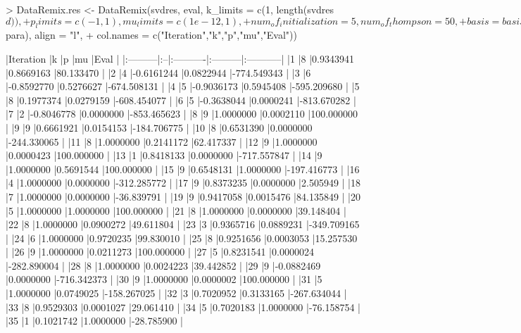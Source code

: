 \documentclass{article}
\begin{document}
\begin{Schunk}
\begin{Sinput}
> DataRemix.res <- DataRemix(svdres, eval, k_limits = c(1, length(svdres$d)), 
+                  p_limits = c(-1,1), mu_limits = c(1e-12,1), 
+                  num_of_initialization = 5, num_of_thompson = 50, 
+                  basis = basis_short, xi = 0.1, full = T, verbose = F, 
+                  X = X, penalty = 100)
> knitr::kable(cbind(1:55,DataRemix.res$para), align = "l", 
+              col.names = c("Iteration","k","p","mu","Eval"))
\end{Sinput}
\begin{Soutput}
|Iteration |k  |p          |mu        |Eval        |
|:---------|:--|:----------|:---------|:-----------|
|1         |8  |0.9343941  |0.8669163 |80.133470   |
|2         |4  |-0.6161244 |0.0822944 |-774.549343 |
|3         |6  |-0.8592770 |0.5276627 |-674.508131 |
|4         |5  |-0.9036173 |0.5945408 |-595.209680 |
|5         |8  |0.1977374  |0.0279159 |-608.454077 |
|6         |5  |-0.3638044 |0.0000241 |-813.670282 |
|7         |2  |-0.8046778 |0.0000000 |-853.465623 |
|8         |9  |1.0000000  |0.0002110 |100.000000  |
|9         |9  |0.6661921  |0.0154153 |-184.706775 |
|10        |8  |0.6531390  |0.0000000 |-244.330065 |
|11        |8  |1.0000000  |0.2141172 |62.417337   |
|12        |9  |1.0000000  |0.0000423 |100.000000  |
|13        |1  |0.8418133  |0.0000000 |-717.557847 |
|14        |9  |1.0000000  |0.5691544 |100.000000  |
|15        |9  |0.6548131  |1.0000000 |-197.416773 |
|16        |4  |1.0000000  |0.0000000 |-312.285772 |
|17        |9  |0.8373235  |0.0000000 |2.505949    |
|18        |7  |1.0000000  |0.0000000 |-36.839791  |
|19        |9  |0.9417058  |0.0015476 |84.135849   |
|20        |5  |1.0000000  |1.0000000 |100.000000  |
|21        |8  |1.0000000  |0.0000000 |39.148404   |
|22        |8  |1.0000000  |0.0900272 |49.611804   |
|23        |3  |0.9365716  |0.0889231 |-349.709165 |
|24        |6  |1.0000000  |0.9720235 |99.830010   |
|25        |8  |0.9251656  |0.0003053 |15.257530   |
|26        |9  |1.0000000  |0.0211273 |100.000000  |
|27        |5  |0.8231541  |0.0000024 |-282.890004 |
|28        |8  |1.0000000  |0.0024223 |39.442852   |
|29        |9  |-0.0882469 |0.0000000 |-716.342373 |
|30        |9  |1.0000000  |0.0000002 |100.000000  |
|31        |5  |1.0000000  |0.0749025 |-158.267025 |
|32        |3  |0.7020952  |0.3133165 |-267.634044 |
|33        |8  |0.9529303  |0.0001027 |29.061410   |
|34        |5  |0.7020183  |1.0000000 |-76.158754  |
|35        |1  |0.1021742  |1.0000000 |-28.785900  |

\end{Soutput}
\end{Schunk}
\end{document}
